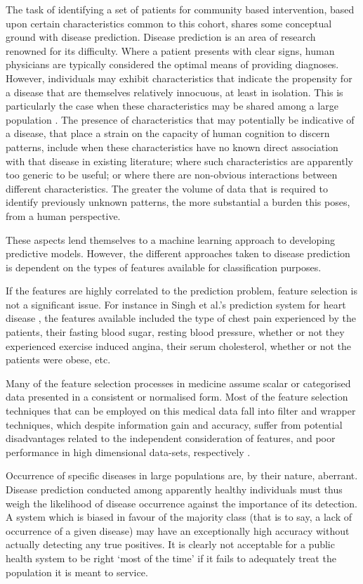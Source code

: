 The task of identifying a set of patients for community based intervention, based upon certain characteristics common to this cohort, shares some conceptual ground with disease prediction. Disease prediction is an area of research renowned for its difficulty. Where a patient presents with clear signs, human physicians are typically considered the optimal means of  providing diagnoses. However, individuals may exhibit characteristics that indicate the propensity for a disease that are themselves relatively innocuous, at least in isolation. This is particularly the case when these characteristics may be shared among a large population \cite{vos2016global}. The presence of characteristics that may potentially be indicative of a disease, that place a strain on the capacity of human cognition to discern patterns, include when these characteristics have no known direct association with that disease in existing literature; where such characteristics are apparently too generic to be useful; or where there are non-obvious interactions between different characteristics. The greater the volume of data that is required to identify previously unknown patterns, the more substantial a burden this poses, from a human perspective. 

These aspects lend themselves to a machine learning approach to developing predictive models. However, the different approaches taken to disease prediction is dependent on the types of features available for classification purposes. 

If the features are highly correlated to the prediction problem, feature selection is not a significant issue. For instance in Singh et al.'s prediction system for heart disease \cite{singh2018effective}, the features available included the type of chest pain experienced by the patients, their fasting blood sugar, resting blood pressure, whether or not they experienced exercise induced angina, their serum cholesterol, whether or not the patients were obese, etc.

Many of the feature selection processes in medicine assume scalar or categorised data presented in a consistent or normalised form. Most of the feature selection techniques that can be employed on this medical data fall into filter and wrapper techniques, which despite information gain and accuracy, suffer from potential disadvantages related to the independent consideration of features, and poor performance in high dimensional data-sets, respectively \cite{long2015highly}.

Occurrence of specific diseases in large populations are, by their nature, aberrant. Disease prediction conducted among apparently healthy individuals must thus weigh the likelihood of disease occurrence against the importance of its detection. A system which is biased in favour of the majority class (that is to say, a lack of occurrence of a given disease) may have an exceptionally high accuracy without actually detecting any true positives. It is clearly not acceptable for a public health system to be right `most of the time' if it fails to adequately treat the population it is meant to service.        


